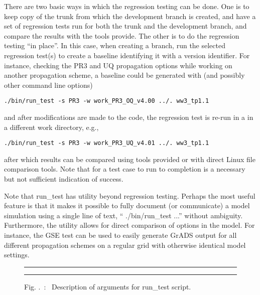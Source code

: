 \documentclass[12pt]{article}
\newcommand{\topline}{\rule{152mm}{0.5mm}}
\newcommand{\botline}{\vspace{1 mm}\rule{152mm}{0.5mm}}
\newcommand{\file}{\sf}
\newcommand{\code}{\tt}
\newcommand{\command}[1]{\begin{center}{\code #1}\end{center}}
\newcommand{\pb}{\strut \vfill \pagebreak}
\newcounter{myfigno}[section]
\newenvironment{myfig}[1]{\begin{figure}[#1]
                         \refstepcounter{myfigno}}                       
                        {\end{figure}}
\newcommand{\myfcapc}[1]{\begin{center} \ff Fig. \themyfigno\ :~ #1
                         \end{center}}
\renewcommand{\themyfigno}{\thesection.\arabic{myfigno}}
\begin{document}
There are two basic ways in which the regression testing can be done. One is
to keep copy of the trunk from which the development branch is created, and
have a set of regression tests run for both the trunk and the development
branch, and compare the results with the tools provide. The other is to do the
regression testing ``in place''. In this case, when creating a branch, run the
selected regression test(s) to create a baseline identifying it with a version
identifier. For instance, checking the PR3 and UQ propagation options while
working on another propagation scheme, a baseline could be generated with (and
possibly other command line options) \command{./bin/run\_test -s PR3 -w
  work\_PR3\_OQ\_v4.00 ../. ww3\_tp1.1} and after modifications are made to
the code, the regression test is re-run in a in a different work directory,
e.g., \command{./bin/run\_test -s PR3 -w work\_PR3\_UQ\_v4.01 ../. ww3\_tp1.1}
after which results can be compared using tools provided or with direct Linux
file comparison tools.  Note that for a test case to run to completion is a
necessary but not sufficient indication of success.

Note that {\file run\_test} has utility beyond regression testing. Perhaps the
most useful feature is that it makes it possible to fully document (or
communicate) a model simulation using a single line of text, ``{\file
  ./bin/run\_test} ...'' without ambiguity. Furthermore, the utility allows
for direct comparison of options in the model. For instance, the GSE test can
be used to easily generate GrADS output for all different propagation schemes
on a regular grid with otherwise identical model settings.



\pb

\begin{myfig}{tbp}
\topline
\begin{center}
{\scriptsize \begin{minipage}[c]{4.5in}

\end{minipage} }
\end{center}
\botline
\myfcapc{Description of arguments for {\file run\_test} script.}
\label{fig:run_test}
\end{myfig}
\end{document}

